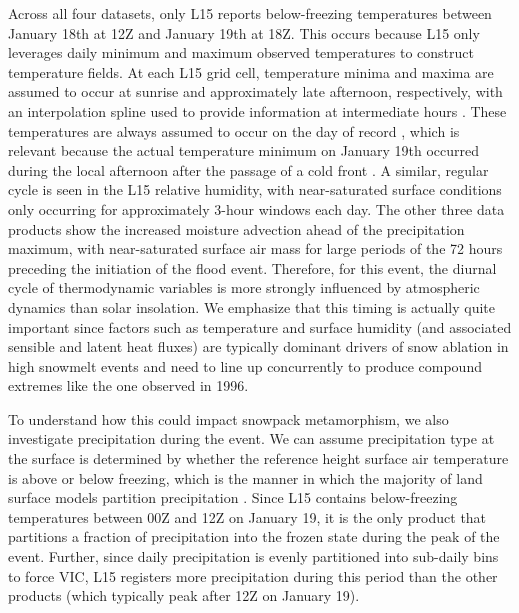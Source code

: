 \documentclass[nhess, manuscript]{copernicus}
\begin{document}
Across all four datasets, only L15 reports below-freezing temperatures between January 18th at 12Z and January 19th at 18Z.
This occurs because L15 only leverages daily minimum and maximum observed temperatures to construct temperature fields.
At each L15 grid cell, temperature minima and maxima are assumed to occur at sunrise and approximately late afternoon, respectively, with an interpolation spline used to provide information at intermediate hours \citep{bohn2013global}.
These temperatures are always assumed to occur on the day of record \citep{livneh2015spatially}, which is relevant because the actual temperature minimum on January 19th occurred during the local afternoon after the passage of a cold front \citep{leathers1998severe}.
A similar, regular cycle is seen in the L15 relative humidity, with near-saturated surface conditions only occurring for approximately 3-hour windows each day. The other three data products show the increased moisture advection ahead of the precipitation maximum, with near-saturated surface air mass for large periods of the 72 hours preceding the initiation of the flood event.
Therefore, for this event, the diurnal cycle of thermodynamic variables is more strongly influenced by atmospheric dynamics than solar insolation.
We emphasize that this timing is actually quite important since factors such as temperature and surface humidity (and associated sensible and latent heat fluxes) are typically dominant drivers of snow ablation in high snowmelt events \citep{mazurkiewicz2008assessing,wurzer2016influence,harpold2018humidity} and need to line up concurrently to produce compound extremes like the one observed in 1996.

To understand how this could impact snowpack metamorphism, we also investigate precipitation during the event.
We can assume precipitation type at the surface is determined by whether the reference height surface air temperature is above or below freezing, which is the manner in which the majority of land surface models partition precipitation \citep{harpold2017rain,jennings2018spatial,Woodburn2021}.
Since L15 contains below-freezing temperatures between 00Z and 12Z on January 19, it is the only product that partitions a fraction of precipitation into the frozen state during the peak of the event.
Further, since daily precipitation is evenly partitioned into sub-daily bins to force VIC, L15 registers more precipitation during this period than the other products (which typically peak after 12Z on January 19).
\end{document}
